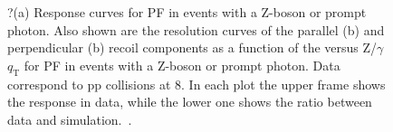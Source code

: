 \begin{figure}[!htb]
\begin{center}
\end{center} 
\caption{?(a) Response curves for PF \VEtmiss in events with a Z-boson or prompt photon.
Also shown are the resolution curves of the parallel (b) and perpendicular (b) recoil components as a function of the versus Z/$\gamma$ $q_\mathrm{T}$ for PF \VEtmiss in events with a Z-boson or prompt photon. 
Data correspond to pp collisions at 8\TeV. 
In each plot the upper frame shows the response in data, while the lower one shows the ratio between data and simulation.~\cite{Khachatryan:2014gga}.}
\label{fig:met_resol}
\end{figure}
